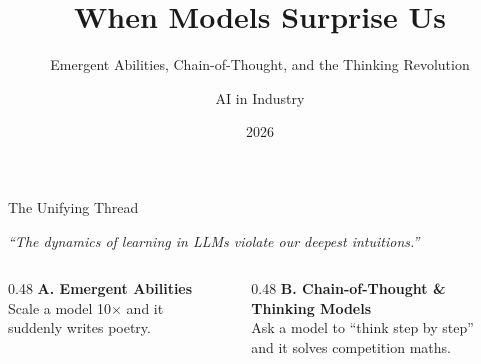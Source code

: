 \documentclass[aspectratio=169, 12pt, xcolor=dvipsnames]{beamer}
\title{When Models Surprise Us}
\subtitle{Emergent Abilities, Chain-of-Thought, and the Thinking Revolution}
\author{AI in Industry}
\date{2026}
\institute{}
\newcommand{\bigquote}[1]{%
  \begin{center}
    \large\itshape ``#1''
  \end{center}
}
\begin{document}
\begin{frame}[plain]
  \vspace*{-2em}
  \titlepage
\end{frame}

\begin{frame}{The Unifying Thread}

\bigquote{The dynamics of learning in LLMs violate our deepest intuitions.}

\vspace{1em}

\begin{columns}[T]
  \begin{column}{0.48\textwidth}
    \centering
    \textbf{A. Emergent Abilities}\\[0.3em]
    {\small Scale a model 10$\times$ and it\\suddenly writes poetry.}
  \end{column}
  \begin{column}{0.48\textwidth}
    \centering
    \textbf{B. Chain-of-Thought \&\\Thinking Models}\\[0.3em]
    {\small Ask a model to ``think step by step''\\and it solves competition maths.}
  \end{column}
\end{columns}

\end{frame}

\end{document}
